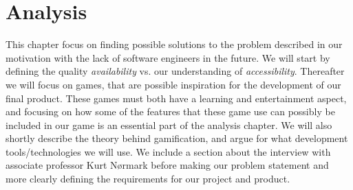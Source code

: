 \chapter{Analysis}
\label{cha:analysis}

This chapter focus on finding possible solutions to the problem described in our motivation with the lack of software engineers in the future. We will start by defining the quality \textit{availability} vs. our understanding of \textit{accessibility}. Thereafter we will focus on games, that are possible inspiration for the development of our final product. These games must both have a learning and entertainment aspect, and focusing on how some of the features that these game use can possibly be included in our game is an essential part of the analysis chapter. We will also shortly describe the theory behind gamification, and argue for what development tools/technologies we will use. We include a section about the interview with associate professor Kurt N{\o}rmark before making our problem statement and more clearly defining the requirements for our project and product.\newpage

%

%
%









